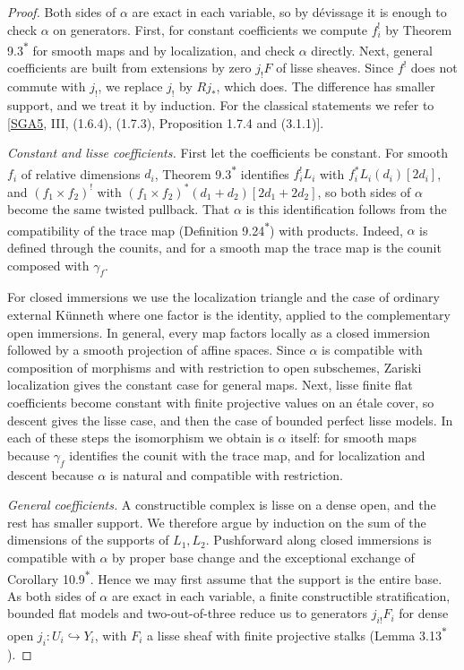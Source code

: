\documentclass[11pt]{article}
\newcommand{\bpout}[1]{#1\textsuperscript{\hyperlink{bp-outside}{\ensuremath{\ast}}}}
\begin{document}
\begin{proof}[{Proof}]\label{bp20}%
Both sides of \(\alpha\) are exact in each variable, so by dévissage it is enough to check \(\alpha\) on generators. First, for constant coefficients we compute \(f_i^!\) by Theorem \bpout{9.3} for smooth maps and by localization, and check \(\alpha\) directly. Next, general coefficients are built from extensions by zero \(j_!F\) of lisse sheaves. Since \(f^!\) does not commute with \(j_!\), we replace \(j_!\) by \(Rj_*\), which does. The difference has smaller support, and we treat it by induction. For the classical statements we refer to [\hyperref[bp57]{SGA5}, III, (1.6.4), (1.7.3), Proposition 1.7.4 and (3.1.1)].

\emph{Constant and lisse coefficients.} First let the coefficients be constant. For smooth \(f_i\) of relative dimensions \(d_i\), Theorem \bpout{9.3} identifies \(f_i^!L_i\) with \(f_i^*L_i(d_i)[2d_i]\), and \((f_1\times f_2)^!\) with \((f_1\times f_2)^*(d_1+d_2)[2d_1+2d_2]\), so both sides of \(\alpha\) become the same twisted pullback. That \(\alpha\) is this identification follows from the compatibility of the trace map (Definition \bpout{9.24}) with products. Indeed, \(\alpha\) is defined through the counits, and for a smooth map the trace map is the counit composed with \(\gamma_f\).

For closed immersions we use the localization triangle and the case of ordinary external Künneth where one factor is the identity, applied to the complementary open immersions. In general, every map factors locally as a closed immersion followed by a smooth projection of affine spaces. Since \(\alpha\) is compatible with composition of morphisms and with restriction to open subschemes, Zariski localization gives the constant case for general maps. Next, lisse finite flat coefficients become constant with finite projective values on an étale cover, so descent gives the lisse case, and then the case of bounded perfect lisse models. In each of these steps the isomorphism we obtain is \(\alpha\) itself: for smooth maps because \(\gamma_f\) identifies the counit with the trace map, and for localization and descent because \(\alpha\) is natural and compatible with restriction.

\emph{General coefficients.} A constructible complex is lisse on a dense open, and the rest has smaller support. We therefore argue by induction on the sum of the dimensions of the supports of \(L_1,L_2\). Pushforward along closed immersions is compatible with \(\alpha\) by proper base change and the exceptional exchange of Corollary \bpout{10.9}. Hence we may first assume that the support is the entire base. As both sides of \(\alpha\) are exact in each variable, a finite constructible stratification, bounded flat models and two-out-of-three reduce us to generators \(j_{i!}F_i\) for dense open \(j_i:U_i\hookrightarrow Y_i\), with \(F_i\) a lisse sheaf with finite projective stalks (Lemma \bpout{3.13}).


\end{proof}
\end{document}
